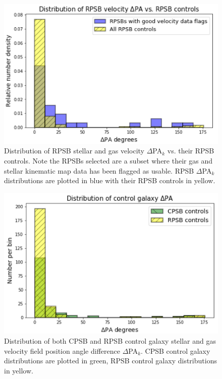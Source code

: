 \begin{figure}
    \centering
    \includegraphics[width=\columnwidth]{images/JupyterPlots/DIST-Good-RPSB+Flags+Controls.png}
    \caption[Distribution of RPSB velocity $\Delta$PA vs. their RPSB controls]{Distribution of RPSB stellar and gas velocity $\Delta$PA$_{k}$ vs. their RPSB controls. Note the RPSBs selected are a subset where their gas and stellar kinematic map data has been flagged as usable. RPSB $\Delta$PA$_{k}$ distributions are plotted in blue with their RPSB controls in yellow.}
    \label{fig:RPSBvsControlDeltaPAs}
\end{figure}


\begin{figure}
    \centering
    \includegraphics[width=\columnwidth]{images/JupyterPlots/DIST-Control-DPA-both.png}
    \caption[Distribution of control galaxy $\Delta$PA$_{k}$]{Distribution of both CPSB and RPSB control galaxy stellar and gas velocity field position angle difference $\Delta$PA$_{k}$. CPSB control galaxy distributions are plotted in green, RPSB control galaxy distributions in yellow.}
    \label{fig:controlDeltaPAs}
\end{figure}

